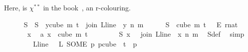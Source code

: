 \begin{isabellebody}
\begin{isamarkuptext}
Here,  is $\chi^{**}$ in the book~\cite{thebook}, an r-colouring.%
\end{isamarkuptext}\isamarkuptrue%
\ \ \ \ \isamarkupfalse%
\ {\isasymchi}S\ \ {\isachardoublequoteopen}{\isasymchi}S\ {\isasymequiv}\ {\isacharparenleft}{\kern0pt}{\isasymlambda}y{\isasymin}cube\ m\ {\isacharparenleft}{\kern0pt}t{\isacharplus}{\kern0pt}{}{\isacharparenright}{\kern0pt}{\isachardot}{\kern0pt}\ {\isasymchi}\ {\isacharparenleft}{\kern0pt}join\ {\isacharparenleft}{\kern0pt}L{\isacharunderscore}{\kern0pt}line\ {}{\isacharparenright}{\kern0pt}\ y\ n\ m{\isacharparenright}{\kern0pt}{\isacharparenright}{\kern0pt}{\isachardoublequoteclose}\isanewline
\ \ \ \ \isamarkupfalse%
\ {\isachardoublequoteopen}{\isasymchi}S\ {\isasymin}\ {\isacharparenleft}{\kern0pt}cube\ m\ {\isacharparenleft}{\kern0pt}t\ {\isacharplus}{\kern0pt}\ {}{\isacharparenright}{\kern0pt}{\isacharparenright}{\kern0pt}\ {\isasymrightarrow}\isactrlsub E\ {\isacharbraceleft}{\kern0pt}{\isachardot}{\kern0pt}{\isachardot}{\kern0pt}{\isacharless}{\kern0pt}r{\isacharcolon}{\kern0pt}{\isacharcolon}{\kern0pt}nat{\isacharbraceright}{\kern0pt}{\isachardoublequoteclose}\isanewline
\ \ \ \ \isamarkupfalse%
\isanewline
\ \ \ \ \ \isamarkupfalse%
\ x\ \isamarkupfalse%
\ a{\isacharcolon}{\kern0pt}\ {\isachardoublequoteopen}x\ {\isasymin}\ cube\ m\ {\isacharparenleft}{\kern0pt}t{\isacharplus}{\kern0pt}{}{\isacharparenright}{\kern0pt}{\isachardoublequoteclose}\isanewline
\ \ \ \ \ \isamarkupfalse%
\ \isamarkupfalse%
\ {\isachardoublequoteopen}{\isasymchi}S\ x\ {\isacharequal}{\kern0pt}\ {\isasymchi}\ {\isacharparenleft}{\kern0pt}join\ {\isacharparenleft}{\kern0pt}L{\isacharunderscore}{\kern0pt}line\ {}{\isacharparenright}{\kern0pt}\ x\ n\ m{\isacharparenright}{\kern0pt}{\isachardoublequoteclose}\ \isamarkupfalse%
\ {\isasymchi}S{\isacharunderscore}{\kern0pt}def\ \isamarkupfalse%
\ simp\isanewline
\ \ \ \ \ \isamarkupfalse%
\ \isamarkupfalse%
\ {\isachardoublequoteopen}L{\isacharunderscore}{\kern0pt}line\ {}\ {\isacharequal}{\kern0pt}\ L\ {\isacharparenleft}{\kern0pt}SOME\ p{\isachardot}{\kern0pt}\ p{\isasymin}cube\ {}\ {\isacharparenleft}{\kern0pt}t{\isacharplus}{\kern0pt}{}{\isacharparenright}{\kern0pt}\ {\isasymand}\ p\ {}\ {\isacharequal}{\kern0pt}\ {}{\isacharparenright}{\kern0pt}{\isachardoublequoteclose}\ \isamarkupfalse%

\end{isabellebody}
